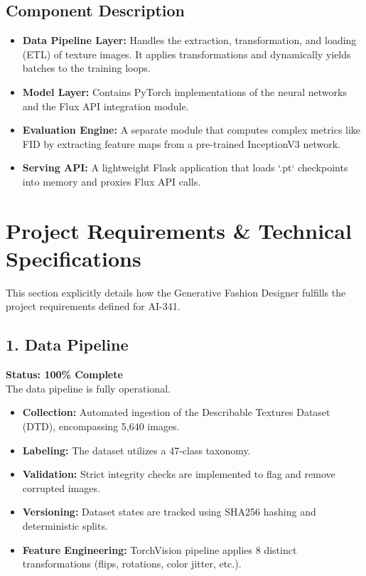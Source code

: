 \documentclass[12pt,a4paper]{article}
\begin{document}
\subsection{Component Description}
\begin{itemize}
    \item \textbf{Data Pipeline Layer:} Handles the extraction, transformation, and loading (ETL) of texture images. It applies transformations and dynamically yields batches to the training loops.
    \item \textbf{Model Layer:} Contains PyTorch implementations of the neural networks and the Flux API integration module.
    \item \textbf{Evaluation Engine:} A separate module that computes complex metrics like FID by extracting feature maps from a pre-trained InceptionV3 network.
    \item \textbf{Serving API:} A lightweight Flask application that loads `.pt` checkpoints into memory and proxies Flux API calls.
\end{itemize}

\section{Project Requirements \& Technical Specifications}

This section explicitly details how the Generative Fashion Designer fulfills the project requirements defined for AI-341.

\subsection{1. Data Pipeline}
\textbf{Status: 100\% Complete} \\
The data pipeline is fully operational.
\begin{itemize}
    \item \textbf{Collection:} Automated ingestion of the Describable Textures Dataset (DTD), encompassing 5,640 images.
    \item \textbf{Labeling:} The dataset utilizes a 47-class taxonomy.
    \item \textbf{Validation:} Strict integrity checks are implemented to flag and remove corrupted images.
    \item \textbf{Versioning:} Dataset states are tracked using SHA256 hashing and deterministic splits.
    \item \textbf{Feature Engineering:} TorchVision pipeline applies 8 distinct transformations (flips, rotations, color jitter, etc.).
\end{itemize}
\end{document}

